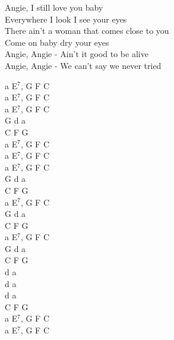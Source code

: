 \documentclass[a5paper, 10pt]{book}
\begin{document}
\begin{minipage}[t]{0.8\textwidth}
  \hspace*{3mm} Angie, I still love you baby\\
  \hspace*{3mm} Everywhere I look I see your eyes\\
  \hspace*{3mm} There ain't a woman that comes close to you\\
  \hspace*{3mm} Come on baby dry your eyes\\

  Angie, Angie - Ain't it good to be alive\\
  Angie, Angie - We can't say we never tried\\

\end{minipage}
\begin{minipage}[t]{0.2\textwidth}
  a E$^7$, G F C \\
  a E$^7$, G F C \\
  a E$^7$, G F C \\

  G d a\\
  C F G\\

  a E$^7$,  G F C \\

  a E$^7$,  G F C \\
  a E$^7$,  G F C \\

  G d a\\
  C F G\\

  a E$^7$, G F C \\

  G d a\\
  C F G\\

  a E$^7$, G F C \\

  G d a\\
  C F G\\

  d a\\
  d a\\
  d a\\
  C F G\\

  a E$^7$, G F C \\
  a E$^7$, G F C \\

\end{minipage}
\end{document}
